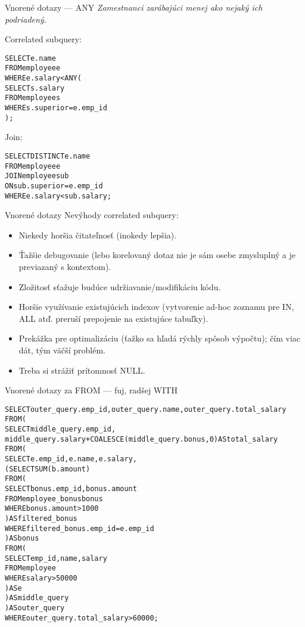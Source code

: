 \documentclass[12pt]{beamer}
\def\blue#1{\textcolor{Cerulean}{#1}}
\begin{document}
\begin{frame}[fragile]{Vnorené dotazy --- ANY}
\footnotesize
\emph{Zamestnanci zarábajúci menej ako nejaký ich podriadený.}\\[7mm]
\begin{minipage}{.4\pdfpagewidth}
Correlated subquery:
\footnotesize
\begin{alltt}
SELECT e.name
FROM employee e
WHERE e.salary < \blue{ANY} (
  SELECT s.salary
  FROM employee s
  WHERE s.superior = e.emp_id
);
\end{alltt}
\end{minipage}
\hfill\vline\hfill
\begin{minipage}{.4\pdfpagewidth}
Join:
\footnotesize
\begin{alltt}
SELECT DISTINCT e.name
FROM employee e
  JOIN employee sub
    ON sub.superior = e.emp_id
WHERE e.salary < sub.salary;


\end{alltt}
\end{minipage}
\end{frame}

\begin{frame}{Vnorené dotazy}
Nevýhody correlated subquery:
\begin{itemize}
\item Niekedy horšia čitateľnosť (inokedy lepšia).
\item Ťažšie debugovanie (lebo korelovaný dotaz nie je sám osebe zmysluplný a je previazaný s kontextom).
\item Zložitosť sťažuje budúce udržiavanie/modifikáciu kódu.
\item Horšie využívanie existujúcich indexov (vytvorenie ad-hoc zoznamu pre IN, ALL atď. preruší prepojenie na existujúce tabuľky).
\item Prekážka pre optimalizáciu (ťažko sa hľadá rýchly spôsob výpočtu); čím viac dát, tým väčší problém.
\item Treba si strážiť prítomnosť NULL.
\end{itemize}
\end{frame}

\begin{frame}[fragile]{Vnorené dotazy za FROM --- fuj, radšej WITH}
\scriptsize
\begin{alltt}
SELECT outer_query.emp_id, outer_query.name, outer_query.total_salary
FROM (
  SELECT middle_query.emp_id,
    middle_query.salary + COALESCE(middle_query.bonus, 0) AS total_salary
  FROM (
    SELECT e.emp_id, e.name, e.salary,
      (SELECT SUM(b.amount)
       FROM (
         SELECT bonus.emp_id, bonus.amount
         FROM employee_bonus bonus
         WHERE bonus.amount > 1000
       ) AS filtered_bonus
       WHERE filtered_bonus.emp_id = e.emp_id
      ) AS bonus
    FROM (
      SELECT emp_id, name, salary
      FROM employee
      WHERE salary > 50000
    ) AS e
  ) AS middle_query
) AS outer_query
WHERE outer_query.total_salary > 60000;
\end{alltt}
\end{frame}
\end{document}
